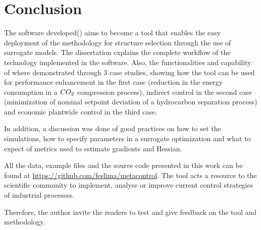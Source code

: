 \documentclass[../msc-thesis.tex]{subfiles}
\begin{document}
\chapter{Conclusion}

The software developed(\mtc) aims to become a tool that enables the easy 
deployment of the methodology for \soc structure selection through the use 
of surrogate models. The dissertation explains the complete workflow of the 
technology implemented in the software. Also, the functionalities 
and capability of \mtc where demonstrated through 3 case studies,
showing how the tool can be used for performance enhancement in the first case 
(reduction in the energy consumption in a $CO\textsubscript{2}$ compression 
process), indirect control in the second case (minimization of nominal setpoint 
deviation of a hydrocarbon separation process) and economic plantwide control 
in the third case.

In addition, a discussion was done of good practices on how to set the 
simulations, how to specify parameters in a surrogate optimization and what to 
expect of metrics used to estimate gradients and Hessian.

All the data, example files and the \mtc source code presented 
in this work can be found at \url{https://github.com/feslima/metacontrol}. The 
tool acts a resource to the scientific community to implement, analyse or 
improve current control strategies of industrial processes.

Therefore, the author invite the readers to test and give feedback on the tool 
and methodology.
\end{document}
